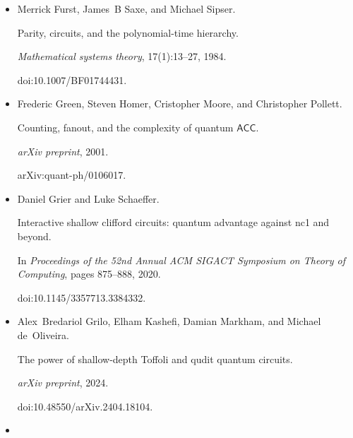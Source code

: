 \documentclass[10pt,a4paper]{article}
\begin{document}
\begin{itemize}
Quantum lower bounds for fanout.


\emph{Quantum Information and Computation}, 6(1):046–057, 2006.


doi:10.26421/QIC6.1-3.





\item[] 
[7]

Merrick Furst, James B Saxe, and Michael Sipser.


Parity, circuits, and the polynomial-time hierarchy.


\emph{Mathematical systems theory}, 17(1):13–27, 1984.


doi:10.1007/BF01744431.





\item[] 
[8]

Frederic Green, Steven Homer, Cristopher Moore, and Christopher Pollett.


Counting, fanout, and the complexity of quantum ${\mathsf{ACC}}$.


\emph{arXiv preprint}, 2001.


arXiv:quant-ph/0106017.





\item[] 
[9]

Daniel Grier and Luke Schaeffer.


Interactive shallow clifford circuits: quantum advantage against
nc1 and beyond.


In \emph{Proceedings of the 52nd Annual ACM SIGACT Symposium on Theory
of Computing}, pages 875–888, 2020.


doi:10.1145/3357713.3384332.





\item[] 
[10]

Alex Bredariol Grilo, Elham Kashefi, Damian Markham, and Michael de Oliveira.


The power of shallow-depth Toffoli and qudit quantum circuits.


\emph{arXiv preprint}, 2024.


doi:10.48550/arXiv.2404.18104.





\item[] 
[11]


\end{itemize}
\end{document}
